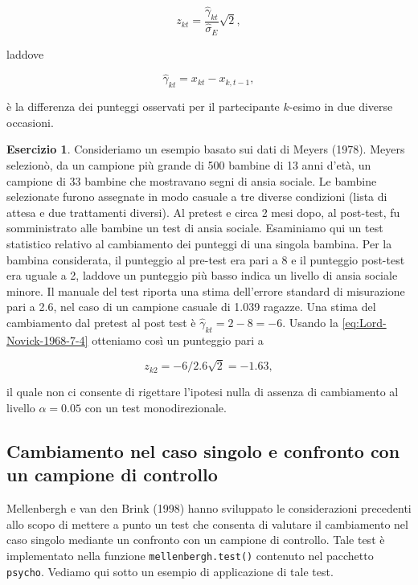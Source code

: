 \documentclass[
  11pt,
]{krantz}
\theoremstyle{definition}
\theoremstyle{definition}
\theoremstyle{definition}
\newtheorem{exercise}{Esercizio}[chapter]
\theoremstyle{definition}
\theoremstyle{remark}
\begin{document}
\[
z_{kt} = \frac{\hat{\gamma}_{kt}}{\hat{\sigma}_E} \sqrt{2}, 
\label{eq:Lord-Novick-1968-7-4}
\]

laddove

\[
\hat{\gamma}_{kt} = x_{kt} - x_{k, t-1}, 
\]

è la differenza dei punteggi osservati per il partecipante \(k\)-esimo in due diverse occasioni.

\begin{exercise}
Consideriamo un esempio basato sui dati di Meyers (1978). Meyers selezionò, da un campione più grande di 500 bambine di 13 anni d'età, un campione di 33 bambine che mostravano segni di ansia sociale. Le bambine selezionate furono assegnate in modo casuale a tre diverse condizioni (lista di attesa e due trattamenti diversi). Al pretest e circa 2 mesi dopo, al post-test, fu somministrato alle bambine un test di ansia sociale. Esaminiamo qui un test statistico relativo al cambiamento dei punteggi di una singola bambina. Per la bambina considerata, il punteggio al pre-test era pari a 8 e il punteggio post-test era uguale a 2, laddove un punteggio più basso indica un livello di ansia sociale minore. Il manuale del test riporta una stima dell'errore standard di misurazione pari a 2.6, nel caso di un campione casuale di 1.039 ragazze. Una stima del cambiamento dal pretest al post test è \(\hat{\gamma}_{kt} = 2 - 8 = -6\). Usando la \eqref{eq:Lord-Novick-1968-7-4} otteniamo così un punteggio pari a

\[
z_{k2} = -6 / 2.6 \sqrt{2} = -1.63,
\]

il quale non ci consente di rigettare l'ipotesi nulla di assenza di cambiamento al livello \(\alpha = 0.05\) con un test monodirezionale.
\end{exercise}

\hypertarget{cambiamento-nel-caso-singolo-e-confronto-con-un-campione-di-controllo}{%
\subsection{Cambiamento nel caso singolo e confronto con un campione di controllo}\label{cambiamento-nel-caso-singolo-e-confronto-con-un-campione-di-controllo}}

Mellenbergh e van den Brink (1998) hanno sviluppato le considerazioni precedenti allo scopo di mettere a punto un test che consenta di valutare il cambiamento nel caso singolo mediante un confronto con un campione di controllo. Tale test è implementato nella funzione \texttt{mellenbergh.test()} contenuto nel pacchetto \texttt{psycho}. Vediamo qui sotto un esempio di applicazione di tale test.
\end{document}
